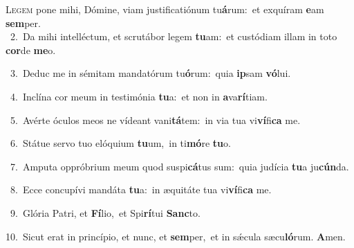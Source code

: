 \lettrine{\initial\textcolor{\initialcolor}{L}}{egem} pone mihi, Dómine, viam justificatiónum tu\-\textbf{á}\-rum:~\star et exquíram \textbf{e}\-am \textbf{sem}\-per.\\
{\numbfont\textcolor{\numbcolor}{~2.}}~Da mihi intelléctum, et scrutábor legem \textbf{tu}\-am:~\star et custódiam illam in toto \textbf{cor}\-de \textbf{me}\-o.\par
{\numbfont\textcolor{\numbcolor}{~3.}}~Deduc me in sémitam mandatórum tu\-\textbf{ó}\-rum:~\star quia \textbf{ip}\-sam \textbf{vó}\-lui.\par
{\numbfont\textcolor{\numbcolor}{~4.}}~Inclína cor meum in testimónia \textbf{tu}\-a:~\star et non in \textbf{a}\-va\-\textbf{rí}\-tiam.\par
{\numbfont\textcolor{\numbcolor}{~5.}}~Avérte óculos meos ne vídeant vani\-\textbf{tá}\-tem:~\star in via tua vi\-\textbf{ví}\-fi\textbf{ca} me.\par
{\numbfont\textcolor{\numbcolor}{~6.}}~Státue servo tuo elóquium \textbf{tu}\-um,~\star in ti\-\textbf{mó}\-re \textbf{tu}\-o.\par
{\numbfont\textcolor{\numbcolor}{~7.}}~Amputa oppróbrium meum quod suspi\-\textbf{cá}\-tus sum:~\star quia judícia \textbf{tu}\-a ju\-\textbf{cún}\-da.\par
{\numbfont\textcolor{\numbcolor}{~8.}}~Ecce concupívi mandáta \textbf{tu}\-a:~\star in æquitáte tua vi\-\textbf{ví}\-fi\textbf{ca} me.\par
{\numbfont\textcolor{\numbcolor}{~9.}}~Glória Patri, et \textbf{Fí}\-lio,~\star et Spi\-\textbf{rí}\-tui \textbf{Sanc}\-to.\par
{\numbfont\textcolor{\numbcolor}{10.}}~Sicut erat in princípio, et nunc, et \textbf{sem}\-per,~\star et in sǽcula sæcu\-\textbf{ló}\-rum. \textbf{A}\-men.\par
